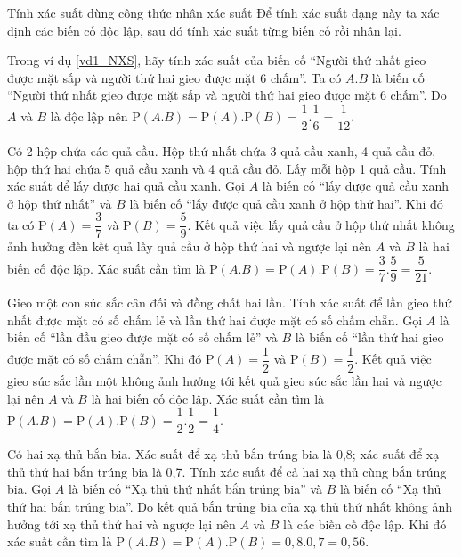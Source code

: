 \begin{dang}{Tính xác suất dùng công thức nhân xác suất}
	Để tính xác suất dạng này ta xác định các biến cố độc lập, sau đó tính xác suất từng biến cố rồi nhân lại.
\end{dang}
\begin{vd}%
	Trong ví dụ \ref{vd1_NXS}, hãy tính xác suất của biến cố ``Người thứ nhất gieo được mặt sấp và người thứ hai gieo được mặt 6 chấm''.
	\loigiai
	{Ta có $A.B$ là biến cố ``Người thứ nhất gieo được mặt sấp và người thứ hai gieo được mặt 6 chấm''. Do $A$ và $B$ là độc lập nên $\mathrm{P}(A.B)=\mathrm{P}(A).\mathrm{P}(B)=\dfrac{1}{2}.\dfrac{1}{6}=\dfrac{1}{12}$.
	}
\end{vd}
\begin{vd}%
	Có 2 hộp chứa các quả cầu. Hộp thứ nhất chứa 3 quả cầu xanh, 4 quả cầu đỏ, hộp thứ hai chứa 5 quả cầu xanh và 4 quả cầu đỏ. Lấy mỗi hộp 1 quả cầu. Tính xác suất để lấy được hai quả cầu xanh.
	\loigiai
	{
		Gọi $A$ là biến cố ``lấy được quả cầu xanh ở hộp thứ nhất'' và $B$ là biến cố ``lấy được quả cầu xanh ở hộp thứ hai''. Khi đó ta có $\mathrm{P}(A)=\dfrac{3}{7}$ và $\mathrm{P}(B)=\dfrac{5}{9}$. Kết quả việc lấy quả cầu ở hộp thứ nhất không ảnh hưởng đến kết quả lấy quả cầu ở hộp thứ hai và ngược lại nên $A$ và $B$ là hai biến cố độc lập. Xác suất cần tìm là $\mathrm{P}(A.B)=\mathrm{P}(A).\mathrm{P}(B)=\dfrac{3}{7}.\dfrac{5}{9}=\dfrac{5}{21}$.
	}
\end{vd}
\begin{vd}%
	Gieo một con súc sắc cân đối và đồng chất hai lần. Tính xác suất để lần gieo thứ nhất được mặt có số chấm lẻ và lần thứ hai được mặt có số chấm chẵn.
	\loigiai
	{
		Gọi $A$ là biến cố ``lần đầu gieo được mặt có số chấm lẻ'' và $B$ là biến cố ``lần thứ hai gieo được mặt có số chấm chẵn''. Khi đó $\mathrm{P}(A)=\dfrac{1}{2}$ và $\mathrm{P}(B)=\dfrac{1}{2}$. Kết quả việc gieo súc sắc lần một không ảnh hưởng tới kết quả gieo súc sắc lần hai và ngược lại nên $A$ và $B$ là hai biến cố độc lập. Xác suất cần tìm là $\mathrm{P}(A.B)=\mathrm{P}(A).\mathrm{P}(B)=\dfrac{1}{2}.\dfrac{1}{2}=\dfrac{1}{4}$.
	}
\end{vd}
\begin{vd}%
	Có hai xạ thủ bắn bia. Xác suất để xạ thủ bắn trúng bia là 0,8; xác suất để xạ thủ thứ hai bắn trúng bia là 0,7. Tính xác suất để cả hai xạ thủ cùng bắn trúng bia.
	\loigiai
	{
		Gọi $A$ là biến cố ``Xạ thủ thứ nhất bắn trúng bia'' và $B$ là biến cố ``Xạ thủ thứ hai bắn trúng bia''. Do kết quả bắn trúng bia của xạ thủ thứ nhất không ảnh hưởng tới xạ thủ thứ hai và ngược lại nên $A$ và $B$ là các biến cố độc lập. Khi đó xác suất cần tìm là $\mathrm{P}(A.B)=\mathrm{P}(A).\mathrm{P}(B)=0,8.0,7= 0,56$.
	}
\end{vd}
